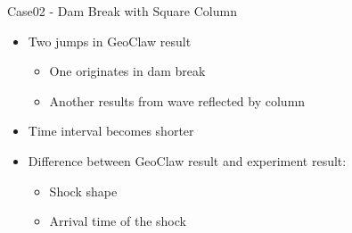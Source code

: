\documentclass[xcolor=dvipsnames]{beamer}
\begin{document}
\begin{frame}[label=sec-5-4]{Case02 - Dam Break with Square Column}
\begin{block}{}
\begin{itemize}
\item Two jumps in GeoClaw result
\begin{itemize}
\item One originates in dam break
\item Another results from wave reflected by column
\end{itemize}
\item Time interval becomes shorter
\item Difference between GeoClaw result and experiment result:
\begin{itemize}
\item Shock shape
\item Arrival time of the shock
\end{itemize}
\end{itemize}
\end{block}
\end{frame}
\end{document}
